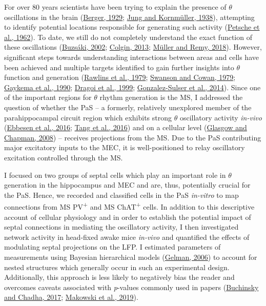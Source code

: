 \documentclass[
  12pt,
  a4paper,
  openany]{book}
\begin{document}
For over 80 years scientists have been trying to explain the presence of \(\theta\) oscillations in the brain (\protect\hyperlink{ref-berger_uber_1929}{Berger, 1929}; \protect\hyperlink{ref-jung_method_1938}{Jung and Kornmüller, 1938}), attempting to identify potential locations responsible for generating such activity (\protect\hyperlink{ref-petsche_significance_1962}{Petsche et al., 1962}). To date, we still do not completely understand the exact function of these oscillations (\protect\hyperlink{ref-buzsaki_theta_2002}{Buzsáki, 2002}; \protect\hyperlink{ref-colgin_mechanisms_2013}{Colgin, 2013}; \protect\hyperlink{ref-muller_septohippocampal_2018}{Müller and Remy, 2018}). However, significant steps towards understanding interactions between areas and cells have been achieved and multiple targets identified to gain further insights into \(\theta\) function and generation (\protect\hyperlink{ref-rawlins_septo-hippocampal_1979}{Rawlins et al., 1979}; \protect\hyperlink{ref-swanson_connections_1979}{Swanson and Cowan, 1979}; \protect\hyperlink{ref-gaykema_cortical_1990}{Gaykema et al., 1990}; \protect\hyperlink{ref-dragoi_interactions_1999}{Dragoi et al., 1999}; \protect\hyperlink{ref-gonzalez-sulser_gabaergic_2014}{Gonzalez-Sulser et al., 2014}). Since one of the important regions for \(\theta\) rhythm generation is the MS, I addressed the question of whether the PaS -- a formerly, relatively unexplored member of the parahippocampal circuit region which exhibits strong \(\theta\) oscillatory activity \emph{in-vivo} (\protect\hyperlink{ref-ebbesen_cell_2016}{Ebbesen et al., 2016}; \protect\hyperlink{ref-tang_functional_2016}{Tang et al., 2016}) and on a cellular level (\protect\hyperlink{ref-glasgow_conductances_2008}{Glasgow and Chapman, 2008}) -- receives projections from the MS. Due to the PaS contributing major excitatory inputs to the MEC, it is well-positioned to relay oscillatory excitation controlled through the MS.

I focused on two groups of septal cells which play an important role in \(\theta\) generation in the hippocampus and MEC and are, thus, potentially crucial for the PaS. Hence, we recorded and classified cells in the PaS \emph{in-vitro} to map connections from MS PV\textsuperscript{+} and MS ChAT\textsuperscript{+} cells. In addition to this descriptive account of cellular physiology and in order to establish the potential impact of septal connections in mediating the oscillatory activity, I then investigated network activity in head-fixed awake mice \emph{in-vivo} and quantified the effects of modulating septal projections on the LFP. I estimated parameters of measurements using Bayesian hierarchical models (\protect\hyperlink{ref-gelman_multilevel_2006}{Gelman, 2006}) to account for nested structures which generally occur in such an experimental design. Additionally, this approach is less likely to negatively bias the reader and overcomes caveats associated with \emph{p}-values commonly used in papers (\protect\hyperlink{ref-buchinsky_p_2017}{Buchinsky and Chadha, 2017}; \protect\hyperlink{ref-makowski_indices_2019}{Makowski et al., 2019}).
\end{document}
